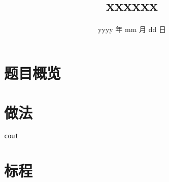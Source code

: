 \documentclass{../cpct/ctsol}
\title{xxxxxx}
\date{yyyy 年 mm 月 dd 日}
\begin{document}
\maketitle
{}

\section*{题目概览}

\solutiontab

\makesolution
\section*{做法}

\verb|cout|

\section*{标程}

\end{document}
